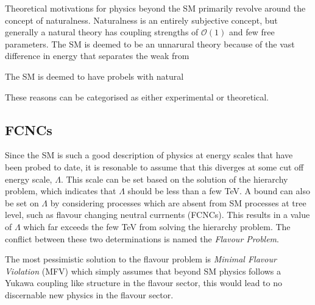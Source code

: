 

Theoretical motivations for physics beyond the SM primarily revolve around the concept of
naturalness.
Naturalness is an entirely subjective concept, but generally a natural theory has coupling
strengths of $\mathcal{O}(1)$ and few free parameters.
The SM is deemed to be an unnarural theory because of the vast difference in energy that separates
the weak from



The SM is deemed to have probels with natural





These reasons can be categorised as either experimental or theoretical.


\subsection{FCNCs}
Since the SM is such a good description of physics at energy scales that have been probed to date,
it is resonable to assume that this diverges at some cut off energy scale, $\Lambda$.
This scale can be set based on the solution of the hierarchy problem, which indicates that
$\Lambda$ should be less than a few TeV.
A bound can also be set on $\Lambda$ by considering processes which are absent from SM processes at
tree level, such as flavour changing neutral currnents (FCNCs).
This results in a value of $\Lambda$ which far exceeds the few TeV from solving the hierarchy
problem.
The conflict between these two determinations is named the \emph{Flavour Problem}.

The most pessimistic solution to the flavour problem is \emph{Minimal Flavour Violation} (MFV)
which simply assumes that beyond SM physics follows a Yukawa coupling like structure in the flavour
sector, this would lead to no discernable new physics in the flavour sector.



